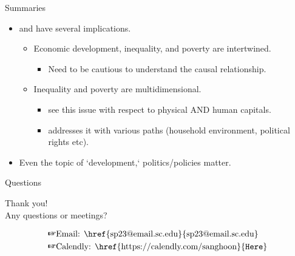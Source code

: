 \documentclass[xcolor=dvipsnames, t]{beamer}
\begin{document}
	\begin{frame}[fragile]{Summaries}
		\begin{itemize}
			\item \citet{king:rebelo:1990} and \citet{duflo:2012} have several implications. \pause
			\begin{itemize}
				\item Economic development, inequality, and poverty are intertwined.
				\begin{itemize}
					\item Need to be cautious to understand the causal relationship. \pause
				\end{itemize}
				\item Inequality and poverty are multidimensional.
				\begin{itemize}
					\item \citet{king:rebelo:1990} see this issue with respect to physical AND human capitals.
					\item \citet{duflo:2012} addresses it with various paths (household environment, political rights etc). \pause
				\end{itemize}
			\end{itemize}
			\item Even the topic of `development,` politics/policies matter.
		\end{itemize}
	\end{frame}
	
	\begin{frame}[fragile, c]{Questions}
		\begin{center}
			{\huge Thank you!}\\
			\bigskip		
			Any questions or meetings?\\
		\end{center}
		\begin{equation*}
			\begin{aligned}
				\text{\ding{43}}& \text{Email: \href{sp23@email.sc.edu}{sp23@email.sc.edu}}\\
				\text{\ding{43}}& \text{Calendly: \href{https://calendly.com/sanghoon}{\texttt{Here}}}
			\end{aligned}
		\end{equation*}
	\end{frame}
	
	\begin{frame}{}
		
		
	\end{frame}
\end{document}
